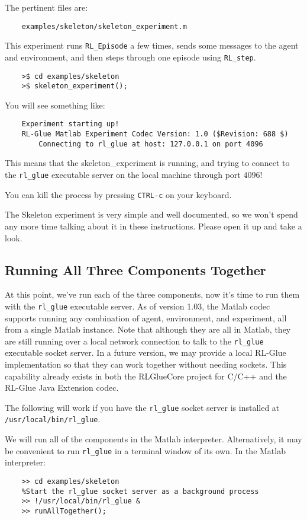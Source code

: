 \documentclass[11pt]{article}
\begin{document}
The pertinent files are:
\begin{verbatim}
	examples/skeleton/skeleton_experiment.m
\end{verbatim}

This experiment runs \texttt{RL\_Episode} a few times, sends some messages to the agent and environment, and then steps through one episode using \texttt{RL\_step}.

\begin{verbatim}
	>$ cd examples/skeleton
	>$ skeleton_experiment();
\end{verbatim}

You will see something like:
\begin{verbatim}
	Experiment starting up!
	RL-Glue Matlab Experiment Codec Version: 1.0 ($Revision: 688 $)
	    Connecting to rl_glue at host: 127.0.0.1 on port 4096
\end{verbatim}

This means that the skeleton\_experiment is running, and trying to connect to the \texttt{rl\_glue} executable server on the local machine through port $4096$!  

You can kill the process by pressing \texttt{CTRL-c} on your keyboard.

The Skeleton experiment is very simple and well documented, so we won't spend any more time talking about it in these instructions.
Please open it up and take a look.

\subsection{Running All Three Components Together}
At this point, we've run each of the three components, now it's time to run them with the \texttt{rl\_glue} executable server.  As of version 1.03, the Matlab codec supports running any combination of agent, environment, and experiment, all from a single Matlab instance.  Note that although they are all in Matlab, they are still running over a local network connection to talk to the \texttt{rl\_glue} executable socket server.  In a future version, we may provide a local RL-Glue implementation so that they can work together without needing sockets. This capability already exists in both the RLGlueCore project for C/C++ and the RL-Glue Java Extension codec.

The following will work if you have the \texttt{rl\_glue} socket server is installed at \texttt{/usr/local/bin/rl\_glue}.

We will run all of the components in the Matlab interpreter.  Alternatively, it may be convenient to run \texttt{rl\_glue} in a terminal window of its own.
In the Matlab interpreter:
\begin{verbatim}
	>> cd examples/skeleton
	%Start the rl_glue socket server as a background process
	>> !/usr/local/bin/rl_glue &
	>> runAllTogether();
\end{verbatim}
\end{document}
